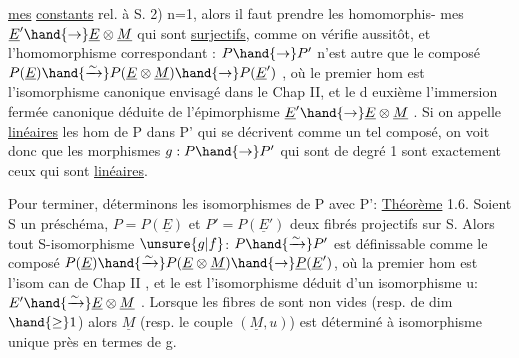 
\uline{mes} \uline{constants} rel. à S. 2) n=1, alors il faut prendre les homomorphis-%
mes  $\underline{E}'\hand{\to} \underline{E}\otimes\underline{M}$ qui sont \uline{surjectifs}, comme on vérifie
aussitôt, et l'homomorphisme correspondant : $P\hand{\to} P'$ n'est autre que le
composé $P(\underline{E})\hand{\xrightarrow{\sim}}P(\underline{E}\otimes\underline{M})\hand{\to} P(\underline{E}')$ , où le premier hom est l'isomorphisme
canonique envisagé dans le Chap II, et le d euxième l'immersion fermée
canonique déduite de l'épimorphisme $\underline{E}'\hand{\to}\underline{E}\otimes\underline{M}$ . Si on appelle \uline{linéaires}
les hom de P dans P' qui se décrivent comme un tel composé, on voit donc
que les morphismes $g:P\hand{\to} P'$ qui sont de degré 1 sont exactement ceux qui
sont \uline{linéaires}.

Pour terminer, déterminons les isomorphismes de P avec P':
\uline{Théorème} 1.6. Soient S un préschéma, $P=P(\underline{E})$ et $P'=P(\underline{E}')$ deux fibrés
projectifs sur S. Alors tout S-isomorphisme $\unsure{g|f}$: $P\hand{\xrightarrow{\sim}}P'$ est définissable
comme le composé $P(\underline{E})\hand{\xrightarrow{\sim}}P(\underline{E}\otimes\underline{M})\hand{\to} \underline{P}(\underline{E}')$, où la premier hom est l'isom
can de Chap II , et le  est l'isomorphisme  déduit
d'un isomorphisme u: $E'\hand{\xrightarrow{\sim}}\underline{E}\otimes\underline{M}$ . Lorsque les fibres de  sont non
vides (resp. de dim $\hand{\geq} 1$) alors $\underline{M}$ (resp. le couple $(\underline{M},u)$) est déterminé
à isomorphisme unique près en termes de g.

